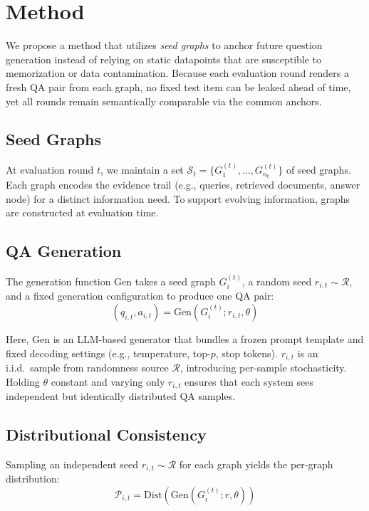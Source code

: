 \section{Method}

We propose a method that utilizes \emph{seed graphs} to anchor future question generation instead of relying on static datapoints that are susceptible to memorization or data contamination. Because each evaluation round renders a fresh QA pair from each graph, no fixed test item can be leaked ahead of time, yet all rounds remain semantically comparable via the common anchors.

\subsection{Seed Graphs}

At evaluation round $t$, we maintain a set $\mathcal{S}_t = \{ G_1^{(t)}, \ldots, G_{n_t}^{(t)} \}$ of seed graphs. Each graph encodes the evidence trail (e.g., queries, retrieved documents, answer node) for a distinct information need. To support evolving information, graphs are constructed at evaluation time.

\subsection{QA Generation}

The generation function $\text{Gen}$ takes a seed graph $G_i^{(t)}$, a random seed $r_{i,t} \sim \mathcal{R}$, and a fixed generation configuration to produce one QA pair:
\begin{equation}
    (q_{i,t}, a_{i,t}) = \text{Gen}(G_i^{(t)}; r_{i,t}, \theta)
\end{equation}

Here, $\text{Gen}$ is an LLM-based generator that bundles a frozen prompt template and fixed decoding settings (e.g., temperature, top-$p$, stop tokens). $r_{i,t}$ is an i.i.d.\ sample from randomness source $\mathcal{R}$, introducing per-sample stochasticity. Holding $\theta$ constant and varying only $r_{i,t}$ ensures that each system sees independent but identically distributed QA samples.

\subsection{Distributional Consistency}

Sampling an independent seed $r_{i,t} \sim \mathcal{R}$ for each graph yields the per-graph distribution:
\begin{equation}
    \mathcal{P}_{i,t} = \text{Dist}(\text{Gen}(G_i^{(t)}; r, \theta))
\end{equation}

